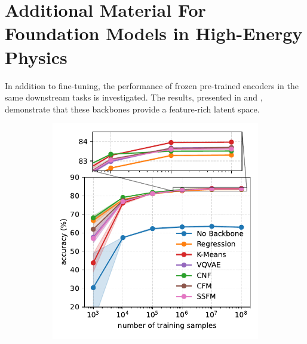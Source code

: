 \chapter{Additional Material For Foundation Models in High-Energy Physics}
\label{app:foundation_models}

In addition to fine-tuning, the performance of frozen pre-trained encoders in the same downstream tasks is investigated.
The results, presented in  and , demonstrate that these backbones provide a feature-rich latent space.

\begin{figure}[h!]
    \centering
    \begin{subfigure}{0.32\linewidth}
        \centering
        \includegraphics[width=\linewidth]{Figures/foundation_models/mpm2/final/jetclass_frozen.pdf}
        \caption{}
        \label{fig:jetclass_fixed}
    \end{subfigure}
    \begin{subfigure}[b]{0.32\textwidth}
        \centering

\end{subfigure}
\end{figure}
